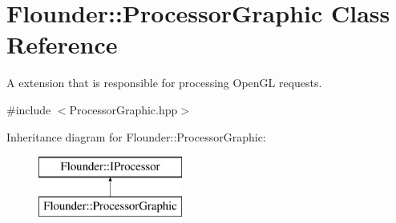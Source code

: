 \hypertarget{class_flounder_1_1_processor_graphic}{}\section{Flounder\+:\+:Processor\+Graphic Class Reference}
\label{class_flounder_1_1_processor_graphic}


A extension that is responsible for processing Open\+GL requests.  




{\ttfamily \#include $<$Processor\+Graphic.\+hpp$>$}

Inheritance diagram for Flounder\+:\+:Processor\+Graphic\+:\begin{figure}[H]
\begin{center}
\leavevmode
\includegraphics[height=2.000000cm]{class_flounder_1_1_processor_graphic}
\end{center}
\end{figure}
